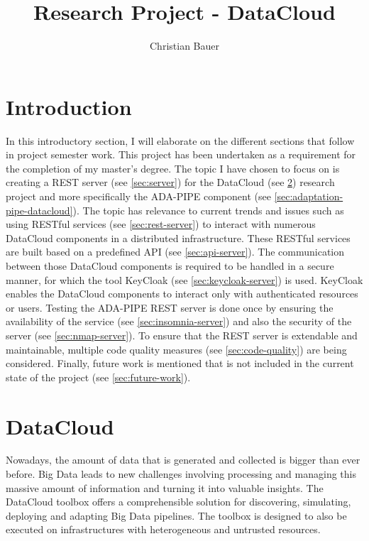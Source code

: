 \documentclass{article}
\title{Research Project - DataCloud}
\author{Christian Bauer}
\begin{document}
    \maketitle

    \tableofcontents
    \lstlistoflistings
    \pagebreak

    \section{Introduction}
    \label{sec:introduction}


        In this introductory section, I will elaborate on the different sections that follow in project semester work.
        This project has been undertaken as a requirement for the completion of my master's degree.
        The topic I have chosen to focus on is creating a REST server (see \ref{sec:server}) for the DataCloud (see \ref{sec:datacloud}) research project and more specifically the ADA-PIPE component (see \ref{sec:adaptation-pipe-datacloud}). 
        The topic has relevance to current trends and issues such as using RESTful services (see \ref{sec:rest-server}) to interact with numerous DataCloud components in a distributed infrastructure. These RESTful services are built based on a predefined API (see \ref{sec:api-server}).
        The communication between those DataCloud components is required to be handled in a secure manner, for which the tool KeyCloak (see \ref{sec:keycloak-server}) is used. KeyCloak enables the DataCloud components to interact only with authenticated resources or users.
        Testing the ADA-PIPE REST server is done once by ensuring the availability of the service (see \ref{sec:insomnia-server})  and also the security of the server (see \ref{sec:nmap-server}).
        To ensure that the REST server is extendable and maintainable, multiple code quality measures (see \ref{sec:code-quality}) are being considered.
        Finally, future work is mentioned that is not included in the current state of the project (see \ref{sec:future-work}).

    \section{DataCloud}
    \label{sec:datacloud}

        Nowadays, the amount of data that is generated and collected is bigger than ever before.
        Big Data leads to new challenges involving processing and managing this massive amount of information and turning it into valuable insights.
        The DataCloud toolbox offers a comprehensible solution for discovering, simulating, deploying and adapting Big Data pipelines.
        The toolbox is designed to also be executed on infrastructures with heterogeneous and untrusted resources.
\end{document}
